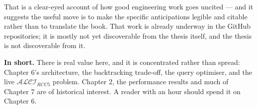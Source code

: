 \documentclass[11pt,a4paper,DIV=12,parskip=half]{scrartcl}
\newenvironment{note}
  {\begin{list}{}{\setlength{\leftmargin}{1.5em}\setlength{\rightmargin}{1.5em}%
                  \setlength{\listparindent}{0pt}}\item[]\small}
  {\end{list}}
\begin{document}
That is a clear-eyed account of how good engineering work goes uncited --- and it
suggests the useful move is to make the specific anticipations legible and
citable rather than to translate the book. That work is already underway in the
GitHub repositories; it is mostly not yet discoverable from the thesis itself,
and the thesis is not discoverable from it.

\begin{note}
\textbf{In short.} There is real value here, and it is concentrated rather than
spread: Chapter 6's architecture, the backtracking trade-off, the query optimiser,
and the live $\mathcal{ALCI}_{RCC5}$ problem. Chapter 2, the performance results
and much of Chapter 7 are of historical interest. A reader with an hour should
spend it on Chapter 6.
\end{note}
\end{document}
